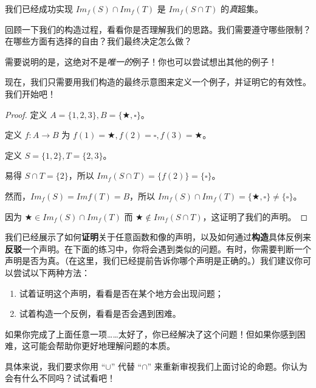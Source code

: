 \begin{example}
\begin{center}
{}
    \end{center}
\end{example}

我们已经成功实现 $Im_f (S) \cap Im_f (T)$ 是 $Im_f (S \cap T)$ 的\emph{真}超集。

回顾一下我们的构造过程，看看你是否理解我们的思路。我们需要遵守哪些限制？在哪些方面有选择的自由？我们最终决定怎么做？

需要说明的是，这绝对不是\emph{唯一的}例子！你也可以尝试想出其他的例子！

现在，我们只需要用我们构造的最终示意图来定义一个例子，并证明它的有效性。我们开始吧！

\begin{proof}
    定义 $A = \{1, 2, 3\}, B = \{\bigstar, \square\}$。

    定义 $f : A \to B$ 为 $f(1) = \bigstar, f(2) = \square, f(3) = \bigstar$。

    定义 $S = \{1, 2\}, T = \{2, 3\}$。

    易得 $S \cap T = \{2\}$，所以 $Im_f (S \cap T) = \{f(2)\} = \{\square\}$。

    然而，$Im_f (S) = Imf (T) = B$，所以 $Im_f (S) \cap Im_f (T) = \{\bigstar, \square\} \ne \{\square\}$。

    因为 $\bigstar \in Im_f (S) \cap Im_f (T)$ 而 $\bigstar \notin Im_f (S \cap T)$，这证明了我们的声明。
\end{proof}

我们已经展示了如何\textbf{证明}关于任意函数和像的声明，以及如何通过\textbf{构造}具体反例来\textbf{反驳}一个声明。在下面的练习中，你将会遇到类似的问题。有时，你需要判断一个声明是否为真。（在这里，我们已经提前告诉你哪个声明是正确的。）我们建议你可以尝试以下两种方法：
\begin{enumerate}[label=(\arabic*)]
    \item 试着证明这个声明，看看是否在某个地方会出现问题；
    \item 试着构造一个反例，看看是否会遇到困难。
\end{enumerate}
如果你完成了上面任意一项……太好了，你已经解决了这个问题！但如果你感到困难，这可能会帮助你更好地理解问题的本质。

具体来说，我们要求你用 ``$\cup$'' 代替 ``$\cap$'' 来重新审视我们上面讨论的命题。你认为会有什么不同吗？试试看吧！
